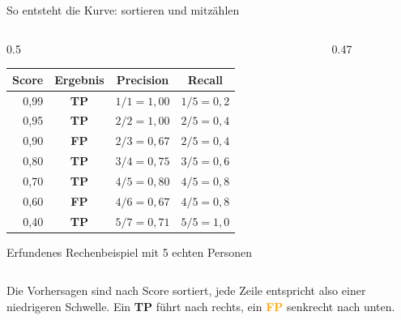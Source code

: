\documentclass[aspectratio=169,11pt]{beamer}
\begin{document}
\begin{frame}{So entsteht die Kurve: sortieren und mitzählen}
  \begin{columns}[c,onlytextwidth]
    \begin{column}{0.5\textwidth}
      \small
      \centering
      \renewcommand{\arraystretch}{1.08}
      \begin{tabular}{r c c c}
        \toprule
        \textbf{Score} & \textbf{Ergebnis} & \textbf{Precision} & \textbf{Recall} \\
        \midrule
        0,99 & {\color{gruen}\textbf{TP}} & $1/1 = 1{,}00$ & $1/5 = 0{,}2$ \\
        0,95 & {\color{gruen}\textbf{TP}} & $2/2 = 1{,}00$ & $2/5 = 0{,}4$ \\
        0,90 & {\color{orange}\textbf{FP}} & $2/3 = 0{,}67$ & $2/5 = 0{,}4$ \\
        0,80 & {\color{gruen}\textbf{TP}} & $3/4 = 0{,}75$ & $3/5 = 0{,}6$ \\
        0,70 & {\color{gruen}\textbf{TP}} & $4/5 = 0{,}80$ & $4/5 = 0{,}8$ \\
        0,60 & {\color{orange}\textbf{FP}} & $4/6 = 0{,}67$ & $4/5 = 0{,}8$ \\
        0,40 & {\color{gruen}\textbf{TP}} & $5/7 = 0{,}71$ & $5/5 = 1{,}0$ \\
        \bottomrule
      \end{tabular}

      \vspace{2mm}
      {\scriptsize\color{grautext}Erfundenes Rechenbeispiel mit 5 echten Personen}
    \end{column}
    \begin{column}{0.47\textwidth}
      \centering
    \end{column}
  \end{columns}

  \vspace{3mm}
  Die Vorhersagen sind nach Score sortiert, jede Zeile entspricht also einer niedrigeren Schwelle.
  Ein \textcolor{gruen}{\textbf{TP}} führt nach rechts, ein \textcolor{orange}{\textbf{FP}} senkrecht nach unten.
\end{frame}
\end{document}
